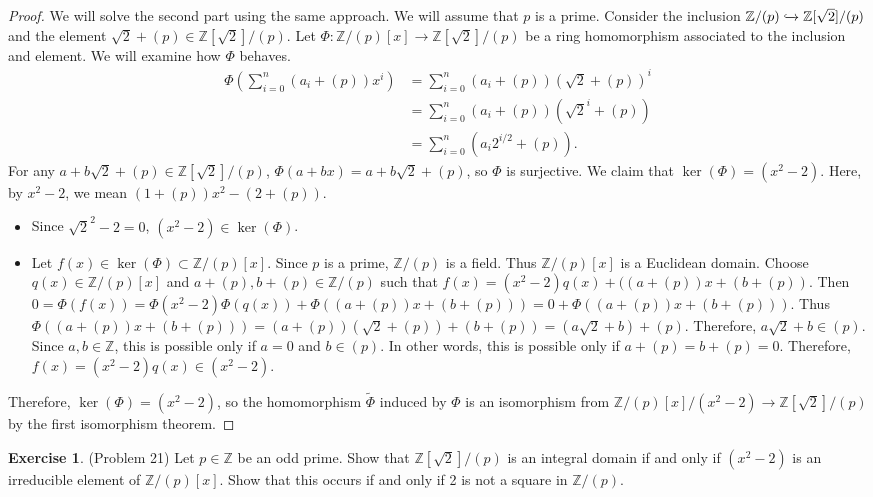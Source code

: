 \documentclass[12pt, psamsfonts]{amsart}
\theoremstyle{definition}
\newtheorem*{exer}{Exercise}
\theoremstyle{remark}
\numberwithin{equation}{section}
\begin{document}
\begin{proof}
  We will solve the second part using the same approach.
  We will assume that $p$ is a prime.
  Consider the inclusion $\mathbb{Z}/(p) \xhookrightarrow{} \mathbb{Z}[\sqrt{2}]/(p)$ and the element $\sqrt{2} + (p) \in \mathbb{Z}[\sqrt{2}]/(p)$.
  Let $\Phi: \mathbb{Z}/(p)[x] \rightarrow \mathbb{Z}[\sqrt{2}]/(p)$ be a ring homomorphism associated to the inclusion and element.
  We will examine how $\Phi$ behaves.
  \begin{align*}
    \Phi(\sum_{i=0}^{n}(a_i + (p))x^i)
      &= \sum_{i=0}^{n}(a_i + (p))(\sqrt{2} + (p))^i \\
      &= \sum_{i=0}^{n}(a_i + (p))(\sqrt{2}^i + (p)) \\
      &= \sum_{i=0}^{n}(a_i 2^{i/2} + (p)).
  \end{align*}
  For any $a + b\sqrt{2} + (p) \in \mathbb{Z}[\sqrt{2}]/(p)$, $\Phi(a + bx) = a + b\sqrt{2} + (p)$, so $\Phi$ is surjective.
  We claim that $\ker(\Phi) = (x^2 - 2)$.
  Here, by $x^2 - 2$, we mean $(1 + (p))x^2 - (2 + (p))$.
  \begin{itemize}
    \item
      Since $\sqrt{2}^2 - 2 = 0$, $(x^2 - 2) \in \ker(\Phi)$.
    \item
      Let $f(x) \in \ker(\Phi) \subset \mathbb{Z}/(p)[x]$.
      Since $p$ is a prime, $\mathbb{Z}/(p)$ is a field.
      Thus $\mathbb{Z}/(p)[x]$ is a Euclidean domain.
      Choose $q(x) \in \mathbb{Z}/(p)[x]$ and $a + (p), b + (p) \in \mathbb{Z}/(p)$ such that $f(x) = (x^2 - 2)q(x) + ((a + (p))x + (b + (p))$.
      Then $0 = \Phi(f(x)) = \Phi(x^2 - 2)\Phi(q(x)) + \Phi((a + (p))x + (b + (p))) = 0 + \Phi((a + (p))x + (b + (p)))$.
      Thus $\Phi((a + (p))x + (b + (p))) = (a + (p))(\sqrt{2} + (p)) + (b + (p)) = (a\sqrt{2} + b) + (p)$.
      Therefore, $a\sqrt{2} + b \in (p)$.
      Since $a, b \in \mathbb{Z}$, this is possible only if $a = 0$ and $b \in (p)$.
      In other words, this is possible only if $a + (p) = b + (p) = 0$.
      Therefore, $f(x) = (x^2 - 2)q(x) \in (x^2 - 2)$.
  \end{itemize}
  Therefore, $\ker(\Phi) = (x^2 - 2)$, so the homomorphism $\tilde{\Phi}$ induced by $\Phi$ is an isomorphism from $\mathbb{Z}/(p)[x]/(x^2 - 2) \rightarrow \mathbb{Z}[\sqrt{2}]/(p)$ by the first isomorphism theorem.
\end{proof}

\begin{exer}{(Problem 21)}
  Let $p \in \mathbb{Z}$ be an odd prime.
  Show that $\mathbb{Z}[\sqrt{2}]/(p)$ is an integral domain if and only if $(x^2 - 2)$ is an irreducible element of $\mathbb{Z}/(p)[x]$.
  Show that this occurs if and only if 2 is not a square in $\mathbb{Z}/(p)$.
\end{exer}
\end{document}
